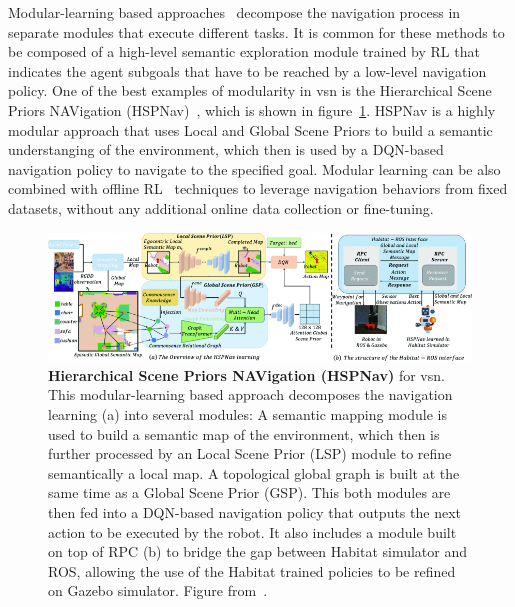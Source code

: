 Modular-learning based approaches~\cite{chaplot2020, chang2020, skillfusion, Li2023RDDRLAR, zhou2022improving, Cai2024DGMemLV, Wang2023ProbableOL, Wasserman2023ExploitationGuidedEF, Yokoyama2023VLFMVF} decompose the navigation process in separate modules that execute different tasks.
It is common for these methods to be composed of a high-level semantic exploration module trained by \acrshort{RL} that indicates the agent subgoals that have to be reached by a low-level navigation policy.
One of the best examples of modularity in \acrshort{vsn} is the Hierarchical Scene Priors NAVigation (HSPNav)~\cite{Kang2024HSPNavHS}, which is shown in figure~\ref{fig:modular-learning}.
HSPNav is a highly modular approach that uses Local and Global Scene Priors to build a semantic understanging of the environment, which then is used by a DQN-based~\cite{mnih2013} navigation policy to navigate to the specified goal.
Modular learning can be also combined with offline RL~\cite{shah2022} techniques to leverage navigation behaviors from fixed datasets, without any additional online data collection or fine-tuning.

\begin{figure}
    \centering
    \includegraphics[width=\textwidth]{figures/related_work/modular_learning}
    \caption{\textbf{Hierarchical Scene Priors NAVigation (HSPNav)} for \acrfull{vsn}.
    This modular-learning based approach decomposes the navigation learning (a) into several modules:
    A semantic mapping module is used to build a semantic map of the environment, which then is further processed by an Local Scene Prior (LSP) module to refine semantically a local map.
    A topological global graph is built at the same time as a Global Scene Prior (GSP).
    This both modules are then fed into a DQN-based navigation policy that outputs the next action to be executed by the robot.
    It also includes a module built on top of RPC (b) to bridge the gap between Habitat simulator and ROS, allowing the use of the Habitat trained policies to be refined on Gazebo simulator.
    Figure from~\cite{Kang2024HSPNavHS}.}
    \label{fig:modular-learning}
\end{figure}

